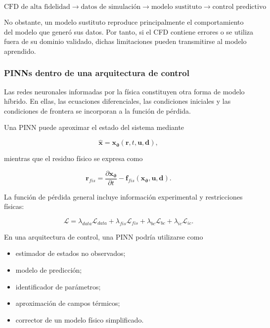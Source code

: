 \begin{equation}
\boxed{
\text{CFD de alta fidelidad}
\rightarrow
\text{datos de simulación}
\rightarrow
\text{modelo sustituto}
\rightarrow
\text{control predictivo}
}
\end{equation}

No obstante, un modelo sustituto reproduce principalmente el comportamiento del modelo que generó sus datos. Por tanto, si el CFD contiene errores o se utiliza fuera de su dominio validado, dichas limitaciones pueden transmitirse al modelo aprendido.

\subsubsection{PINNs dentro de una arquitectura de control}

Las redes neuronales informadas por la física constituyen otra forma de modelo híbrido. En ellas, las ecuaciones diferenciales, las condiciones iniciales y las condiciones de frontera se incorporan a la función de pérdida.

Una PINN puede aproximar el estado del sistema mediante

\begin{equation}
\hat{\mathbf{x}}
=
\mathbf{x}_{\boldsymbol{\vartheta}}
\left(
\mathbf{r},
t,
\mathbf{u},
\mathbf{d}
\right),
\end{equation}

mientras que el residuo físico se expresa como

\begin{equation}
\mathbf{r}_{fis}
=
\frac{\partial\mathbf{x}_{\boldsymbol{\vartheta}}}{\partial t}
-
\mathbf{f}_{fis}
\left(
\mathbf{x}_{\boldsymbol{\vartheta}},
\mathbf{u},
\mathbf{d}
\right).
\end{equation}

La función de pérdida general incluye información experimental y restricciones físicas:

\begin{equation}
\mathcal{L}
=
\lambda_{data}\mathcal{L}_{data}
+
\lambda_{fis}\mathcal{L}_{fis}
+
\lambda_{bc}\mathcal{L}_{bc}
+
\lambda_{ic}\mathcal{L}_{ic}.
\end{equation}

En una arquitectura de control, una PINN podría utilizarse como

\begin{itemize}
    \item estimador de estados no observados;
    \item modelo de predicción;
    \item identificador de parámetros;
    \item aproximación de campos térmicos;
    \item corrector de un modelo físico simplificado.
\end{itemize}

